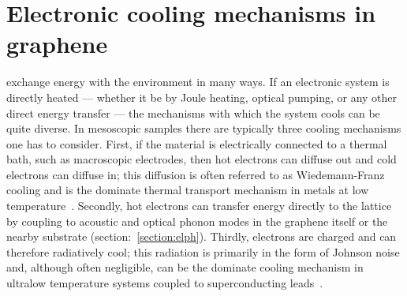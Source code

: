 
\chapter{Electronic cooling mechanisms in graphene}
\label{ch:electronic_cooling}
 exchange energy with the environment in many ways. If an electronic system is directly heated --- whether it be by Joule heating, optical pumping, or any other direct energy transfer --- the mechanisms with which the system cools can be quite diverse. In mesoscopic samples there are typically three cooling mechanisms one has to consider. First, if the material is electrically connected to a thermal bath, such as macroscopic electrodes, then hot electrons can diffuse out and cold electrons can diffuse in; this diffusion is often referred to as Wiedemann-Franz cooling and is the dominate thermal transport mechanism in metals at low temperature~\cite{ashcroft_solid_1976}. Secondly, hot electrons can transfer energy directly to the lattice by coupling to acoustic and optical phonon modes in the graphene itself or the nearby substrate (section:~\ref{section:elph}). Thirdly, electrons are charged and can therefore radiatively cool; this radiation is primarily in the form of Johnson noise and, although often negligible, can be the dominate cooling mechanism in ultralow temperature systems coupled to superconducting leads~\cite{mckitterick_performance_2013, mckitterick_electron-phonon_2016}.

